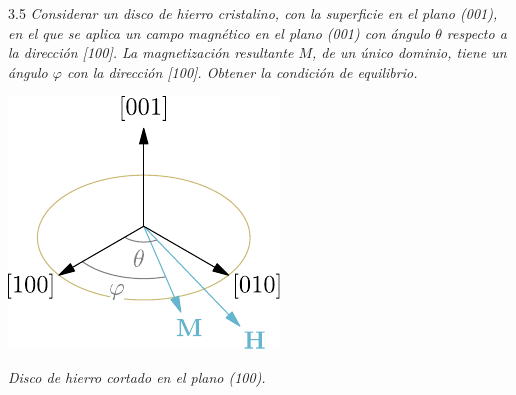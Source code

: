 \documentclass{tufte-book}
\begin{document}
\begin{tcolorbox}[halign=left]
  \lettrine[lines=2]{\color{blue!50!white}3.5}{} \emph{
    Considerar un disco de hierro cristalino, con la superficie en el
    plano (001), en el que se aplica un campo magnético en el plano (001)
    con ángulo $θ$ respecto a la dirección [100]. La magnetización
    resultante $M$, de un único dominio, tiene un ángulo $φ$ con la
    dirección [100]. Obtener la condición de equilibrio.
  }
\end{tcolorbox}


  \begin{marginfigure}[-1cm]
    \centering
    \includegraphics{figures/disk_001.pdf}
    \caption{\itshape Disco de hierro cortado en el plano (100).}
    \label{fig:disk_001}
  \end{marginfigure}
\end{document}
